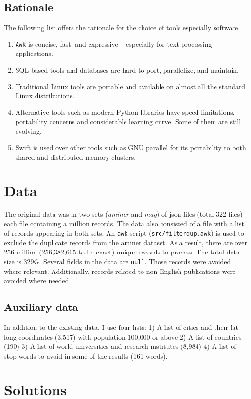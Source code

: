 \documentclass{article}
\begin{document}
\subsection*{Rationale}
The following list offers the rationale for the choice of tools especially software.
\begin{enumerate}
\item \texttt{Awk} is concise, fast, and expressive -- especially for text processing applications.
\item SQL based tools and databases are hard to port, parallelize, and maintain.
\item Traditional Linux tools are portable and available on almost all the standard Linux distributions.
\item Alternative tools such as modern Python libraries have speed limitations, portability concerns and considerable learning curve. Some of them are still evolving.
\item Swift is used over other tools such as GNU parallel for its portability to both shared and distributed memory clusters.
\end{enumerate}

\section*{Data}
The original data was in two sets (\textit{aminer} and \textit{mag}) of json
files (total 322 files) each file containing a million records. The data also
consisted of a file with a list of records appearing in both sets. An \texttt{awk} script
(\texttt{src/filterdup.awk}) is used to exclude the duplicate records from the
aminer dataset. As a result, there are over 256 million (256,382,605 to be
exact) unique records to process. The total data size is 329G. Several
fields in the data are \texttt{null}.  Those records were avoided where
relevant. Additionally, records related to non-English publications were
avoided where needed.

\subsection*{Auxiliary data}
In addition to the existing data, I use four lists: 1) A list of cities and their
lat-long coordinates (3,517) with population 100,000 or above 2) A list
of countries (190) 3) A list of world universities and research institutes
(8,984) 4) A list of stop-words to avoid in some of the results (161 words).

\section*{Solutions}
\end{document}
